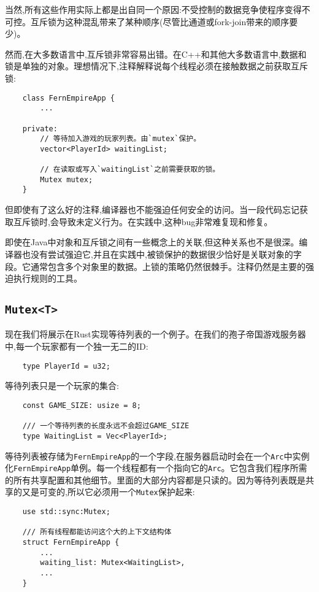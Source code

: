 当然,所有这些作用实际上都是出自同一个原因:不受控制的数据竞争使程序变得不可控。互斥锁为这种混乱带来了某种顺序(尽管比通道或fork-join带来的顺序要少)。

然而,在大多数语言中,互斥锁非常容易出错。在C++和其他大多数语言中,数据和锁是单独的对象。理想情况下,注释解释说每个线程必须在接触数据之前获取互斥锁:
\begin{verbatim}
    class FernEmpireApp {
        ...

    private:
        // 等待加入游戏的玩家列表。由`mutex`保护。
        vector<PlayerId> waitingList;

        // 在读取或写入`waitingList`之前需要获取的锁。
        Mutex mutex;
    }
\end{verbatim}

但即使有了这么好的注释,编译器也不能强迫任何安全的访问。当一段代码忘记获取互斥锁时,会导致未定义行为。在实践中,这种bug非常难复现和修复。

即使在Java中对象和互斥锁之间有一些概念上的关联,但这种关系也不是很深。编译器也没有尝试强迫它,并且在实践中,被锁保护的数据很少恰好是关联对象的字段。它通常包含多个对象里的数据。上锁的策略仍然很棘手。注释仍然是主要的强迫执行规则的工具。

\subsection{\texttt{Mutex<T>}}\label{mutex}
现在我们将展示在Rust实现等待列表的一个例子。在我们的孢子帝国游戏服务器中,每一个玩家都有一个独一无二的ID:
\begin{verbatim}
    type PlayerId = u32;
\end{verbatim}

等待列表只是一个玩家的集合:
\begin{verbatim}
    const GAME_SIZE: usize = 8;
    
    /// 一个等待列表的长度永远不会超过GAME_SIZE
    type WaitingList = Vec<PlayerId>;
\end{verbatim}

等待列表被存储为\texttt{FernEmpireApp}的一个字段,在服务器启动时会在一个\texttt{Arc}中实例化\texttt{FernEmpireApp}单例。每一个线程都有一个指向它的\texttt{Arc}。它包含我们程序所需的所有共享配置和其他细节。里面的大部分内容都是只读的。因为等待列表既是共享的又是可变的,所以它必须用一个\texttt{Mutex}保护起来:
\begin{verbatim}
    use std::sync:Mutex;

    /// 所有线程都能访问这个大的上下文结构体
    struct FernEmpireApp {
        ...
        waiting_list: Mutex<WaitingList>,
        ...
    }
\end{verbatim}

